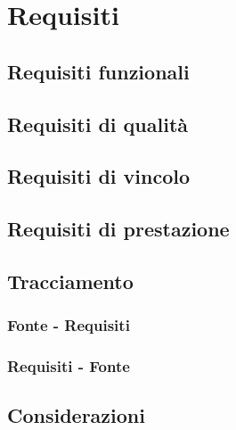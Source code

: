 \section{Requisiti}

\subsection{Requisiti funzionali}
\subsection{Requisiti di qualità}
\subsection{Requisiti di vincolo}
\subsection{Requisiti di prestazione}
\subsection{Tracciamento}
\subsubsection{Fonte - Requisiti}
\subsubsection{Requisiti - Fonte}
\subsection{Considerazioni}